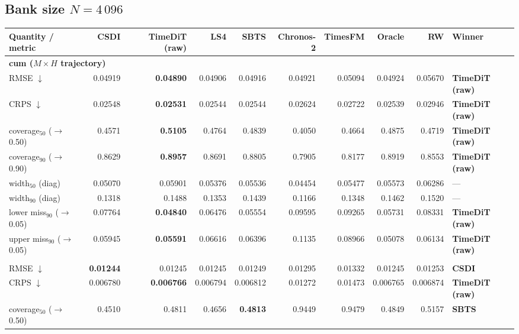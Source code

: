 \documentclass[11pt,a4paper]{article}
\begin{document}
\begin{landscape}
\subsection{Bank size $N = 4\,096$}
\begin{center}\footnotesize
\begin{tabular}{lrrrrrrrrl}
\toprule
Quantity / metric & CSDI & TimeDiT (raw) & LS4 & SBTS & Chronos-2 & TimesFM & Oracle & RW & Winner \\
\midrule
\multicolumn{10}{l}{\textbf{cum ($M\times H$ trajectory)}} \\
RMSE $\downarrow$ & 0.04919 & \textbf{0.04890} & 0.04906 & 0.04916 & 0.04921 & 0.05094 & 0.04924 & 0.05670 & \textbf{TimeDiT (raw)} \\
CRPS $\downarrow$ & 0.02548 & \textbf{0.02531} & 0.02544 & 0.02544 & 0.02624 & 0.02722 & 0.02539 & 0.02946 & \textbf{TimeDiT (raw)} \\
coverage$_{50}$ ($\to$0.50) & 0.4571 & \textbf{0.5105} & 0.4764 & 0.4839 & 0.4050 & 0.4664 & 0.4875 & 0.4719 & \textbf{TimeDiT (raw)} \\
coverage$_{90}$ ($\to$0.90) & 0.8629 & \textbf{0.8957} & 0.8691 & 0.8805 & 0.7905 & 0.8177 & 0.8919 & 0.8553 & \textbf{TimeDiT (raw)} \\
width$_{50}$ (diag) & 0.05070 & 0.05901 & 0.05376 & 0.05536 & 0.04454 & 0.05477 & 0.05573 & 0.06286 & --- \\
width$_{90}$ (diag) & 0.1318 & 0.1488 & 0.1353 & 0.1439 & 0.1166 & 0.1348 & 0.1462 & 0.1520 & --- \\
lower miss$_{90}$ ($\to$0.05) & 0.07764 & \textbf{0.04840} & 0.06476 & 0.05554 & 0.09595 & 0.09265 & 0.05731 & 0.08331 & \textbf{TimeDiT (raw)} \\
upper miss$_{90}$ ($\to$0.05) & 0.05945 & \textbf{0.05591} & 0.06616 & 0.06396 & 0.1135 & 0.08966 & 0.05078 & 0.06134 & \textbf{TimeDiT (raw)} \\
\addlinespace
\multicolumn{10}{l}{\textbf{step ($M\times H$)}} \\
RMSE $\downarrow$ & \textbf{0.01244} & 0.01245 & 0.01245 & 0.01249 & 0.01295 & 0.01332 & 0.01245 & 0.01253 & \textbf{CSDI} \\
CRPS $\downarrow$ & 0.006780 & \textbf{0.006766} & 0.006794 & 0.006812 & 0.01272 & 0.01473 & 0.006765 & 0.006874 & \textbf{TimeDiT (raw)} \\
coverage$_{50}$ ($\to$0.50) & 0.4510 & 0.4811 & 0.4656 & \textbf{0.4813} & 0.9449 & 0.9479 & 0.4849 & 0.5157 & \textbf{SBTS} \\

\end{tabular}
\end{center}
\end{landscape}
\end{document}
